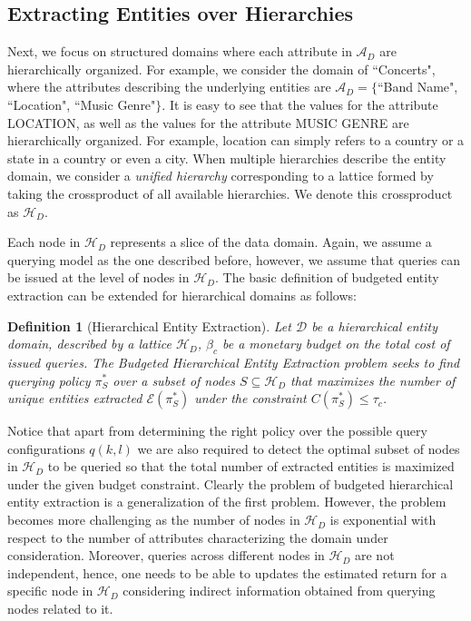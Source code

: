 \documentclass{vldb}
\newtheorem{definition}{Definition}
\newcommand{\domain}{\mathcal{D}}
\newcommand{\attributes}{\mathcal{A}_D}
\newcommand{\hierarchy}{\mathcal{H}_D}
\newcommand{\uentities}{\mathcal{E}}
\begin{document}
\subsection{Extracting Entities over Hierarchies}
Next, we focus on structured domains where each attribute in $\attributes$ are hierarchically organized. For example, we consider the domain of  ``Concerts", where the attributes describing the underlying entities are $\attributes = \{$``Band Name", ``Location", ``Music Genre"$\}$. It is easy to see that the values for the attribute LOCATION, as well as the values for the attribute MUSIC GENRE are hierarchically organized. For example, location can simply refers to a country or a state in a country or even a city. When multiple hierarchies describe the entity domain, we consider a {\em unified hierarchy} corresponding to a lattice formed by taking the crossproduct of all available hierarchies. We denote this crossproduct as $\hierarchy$. 

Each node in $\hierarchy$ represents a slice of the data domain. Again, we assume a querying model as the one described before, however, we assume that queries can be issued at the level of nodes in $\hierarchy$. The basic definition of budgeted entity extraction can be extended for hierarchical domains as follows:
\begin{definition}[Hierarchical Entity Extraction]
Let $\domain$ be a hierarchical entity domain, described by a lattice $\hierarchy$, $\beta_c$ be a monetary budget on the total cost of issued queries. The Budgeted Hierarchical Entity Extraction problem seeks to find querying policy $\pi_S^*$ over a subset of nodes $S \subseteq \hierarchy$ that maximizes the number of unique entities extracted  $\uentities(\pi_S^*)$ under the constraint $C(\pi_S^*) \leq \tau_c$.
\end{definition}

Notice that apart from determining the right policy over the possible query configurations $q(k,l)$ we are also required to detect the optimal subset of nodes in $\hierarchy$ to be queried so that the total number of extracted entities is maximized under the given budget constraint. Clearly the problem of budgeted hierarchical entity extraction is a generalization of the first problem. However, the problem becomes more challenging as the number of nodes in $\hierarchy$ is exponential with respect to the number of attributes characterizing the domain under consideration. Moreover, queries across different nodes in $\hierarchy$ are not independent, hence, one needs to be able to updates the estimated return for a specific node in $\hierarchy$ considering indirect information obtained from querying nodes related to it.
\end{document}
